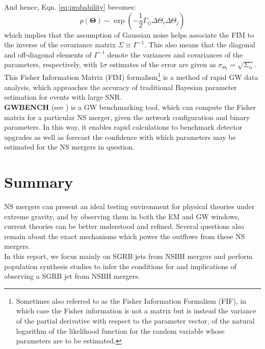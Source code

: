     And hence, Eqn. \ref{eq:probability} becomes:
    \begin{equation}
        p(\mathbf{\Theta}) \sim
            \exp\left(
                         -\dfrac{1}{2}
                          \Gamma_{ij}
                          \Delta\Theta_i
                          \Delta\Theta_j
                \right)
    \end{equation}
    which implies that the assumption of Gaussian noise helps associate the FIM to the
    inverse of the covariance matrix $\Sigma \equiv \Gamma^{-1}$. This also means that
    the diagonal and off-diagonal elements of $\Gamma^{-1}$ denote the variances and
    covariances of the parameters, respectively, with 1$\sigma$ estimates of the error
    are given as $\sigma_{\Theta_i} = \sqrt{\Sigma_{ii}}$.\\
    This Fisher Information Matrix (FIM) formalism\footnote{
        Sometimes also referred to as the Fisher Information Formalism (FIF), in which
        case the Fisher information is not a matrix but is instead the variance of the
        partial derivative with respect to the parameter vector, of the natural
        logarithm of the likelihood function for the random variable whose parameters
        are to be estimated.
    } is a method of rapid GW data analysis, which approaches the accuracy of
    traditional Bayesian parameter estimation for events with large SNR.\\
    \textbf{GWBENCH} (see \cite{borhanian_2020}) is a GW benchmarking tool, which can
    compute the Fisher matrix for a particular NS merger, given the network
    configuration and binary parameters. In this way, it enables rapid calculations to
    benchmark detector upgrades as well as forecast the confidence with which parameters
    may be estimated for the NS mergers in question.\\

\section{Summary}

    NS mergers can present an ideal testing environment for physical theories under
    extreme gravity, and by observing them in both the EM and GW windows, current
    theories can be better understood and refined. Several questions also remain about
    the exact mechanisms which power the outflows from these NS mergers.\\
    In this report, we focus mainly on SGRB jets from NSBH mergers and perform
    population synthesis studies to infer the conditions for and implications of
    observing a SGRB jet from NSBH mergers.